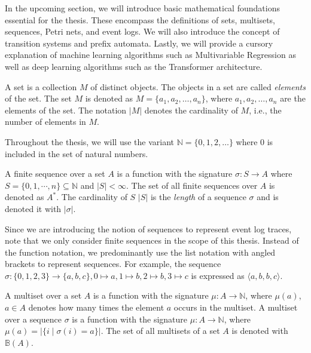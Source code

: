 
In the upcoming section, we will introduce basic mathematical foundations essential for the thesis. These encompass the definitions of sets, multisets, sequences, Petri nets, and event logs. We will also introduce the concept of transition systems and prefix automata. Lastly, we will provide a cursory explanation of machine learning algorithms such as Multivariable Regression as well as deep learning algorithms such as the Transformer architecture.

\begin{definition}[Set]
    A set is a collection $M$ of distinct objects. The objects in a set are called \emph{elements} of the set. The set $M$ is denoted as $M = \{ a_1, a_2, \dots, a_n \}$, where $a_1, a_2, \dots, a_n$ are the elements of the set. The notation $\lvert M \rvert$ denotes the cardinality of $M$, i.e., the number of elements in $M$.
\end{definition}

Throughout the thesis, we will use the variant $\mathbb{N} = \{0, 1, 2, \dots\}$ where $0$ is included in the set of natural numbers.

\begin{definition}
    A finite sequence over a set $A$ is a function with the signature $\sigma \colon S \rightarrow A$ where $S = \{0, 1, \cdots, n \} \subseteq \mathbb{N}$ and $\lvert S \rvert < \infty$. The set of all finite sequences over $A$ is denoted as $A^*$. The cardinality of $S$ $\lvert S \rvert$  is the \emph{length} of a sequence $\sigma$ and is denoted it with $\lvert \sigma \rvert$.
\end{definition}

Since we are introducing the notion of sequences to represent event log traces, note that we only consider finite sequences in the scope of this thesis. Instead of the function notation, we predominantly use the list notation with angled brackets to represent sequences. For example, the sequence $\sigma \colon \{0, 1, 2, 3\} \rightarrow \{a, b, c\}, 0 \mapsto a, 1 \mapsto b, 2 \mapsto b, 3 \mapsto c$ is expressed as $\langle a, b, b, c \rangle$.

\begin{definition}[Multiset]
    A multiset over a set $A$ is a function with the signature $\mu \colon A \rightarrow \mathbb{N}$, where $\mu(a)$, $a \in A$ denotes how many times the element $a$ occurs in the multiset.  
    A multiset over a sequence $\sigma$ is a function with the signature $\mu \colon A \rightarrow \mathbb{N}$, where $\mu(a) = \lvert \{ i \mid \sigma(i) = a \} \rvert$. The set of all multisets of a set $A$ is denoted with $\mathbb{B}(A)$.
\end{definition}

